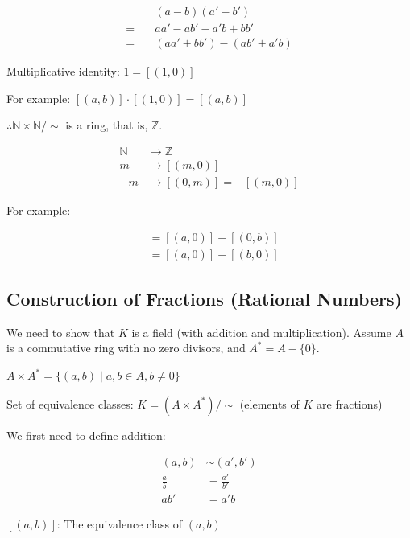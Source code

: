 \documentclass{article}
\begin{document}
    \begin{align*}
        &(a - b)(a' - b') \\
     = \quad &aa' - ab' - a'b + bb' \\
     = \quad &(aa' + bb') - (ab' + a'b)
    \end{align*}
    
    Multiplicative identity: $1 = [(1, 0)]$
    
    For example: $[(a, b)] \cdot [(1, 0)] = [(a, b)]$
    
    $\therefore \mathbb{N} \times \mathbb{N} / \sim$ is a ring, that is, $\mathbb{Z}$.
    
    \begin{align*}
        \mathbb{N} &\longrightarrow \mathbb{Z} \\
        m &\longrightarrow [(m, 0)] \\
        -m &\longrightarrow [(0, m)] = -[(m, 0)]
    \end{align*}
    
    For example:
    
    \begin{align*}
        [(a, b)] &= [(a, 0)] + [(0, b)] \\
                   &= [(a, 0)] - [(b, 0)]
    \end{align*}
    
    \subsection{Construction of Fractions (Rational Numbers)}
    
    We need to show that $K$ is a field (with addition and multiplication). Assume $A$ is a commutative ring with no zero divisors, and $A^{\ast} = A - \{ 0 \}$.
    
    $A \times A^{\ast} = \{ (a, b) \mid a, b \in A, b \neq 0 \}$
    
    Set of equivalence classes: $K = (A \times A^{\ast}) / \sim$ (elements of $K$ are fractions)
    
    We first need to define addition:
    
    \begin{align*}
        (a, b) &\sim (a', b') \\
        \frac{a}{b} &= \frac{a'}{b'} \\
        ab' &= a'b
    \end{align*}
    
    $[(a, b)]$: The equivalence class of $(a, b)$
    
\end{document}
